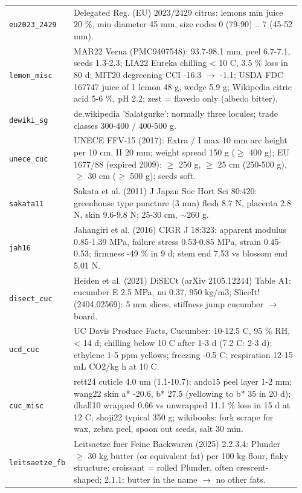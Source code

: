 \documentclass[10.5pt,a4paper]{article}
\begin{document}
{\begin{longtable}{@{}p{0.16\linewidth}p{0.8\linewidth}@{}}
\texttt{eu2023\_\allowbreak{}2429} & Delegated Reg. (EU) 2023/2429 citrus: lemons min juice 20 \%, min diameter 45 mm, size codes 0 (79-90) .. 7 (45-52 mm). \\
\texttt{lemon\_\allowbreak{}misc} & MAR22 Verna (PMC9407548): 93.7-98.1 mm, peel 6.7-7.1, seeds 1.3-2.3; LIA22 Eureka chilling < 10 C, 3.5 \% loss in 80 d; MIT20 degreening CCI -16.3 $\to$ -1.1; USDA FDC 167747 juice of 1 lemon 48 g, wedge 5.9 g; Wikipedia citric acid 5-6 \%, pH 2.2; zest = flavedo only (albedo bitter). \\
\texttt{dewiki\_\allowbreak{}sg} & de.wikipedia 'Salatgurke': normally three locules; trade classes 300-400 / 400-500 g. \\
\texttt{unece\_\allowbreak{}cuc} & UNECE FFV-15 (2017): Extra / I max 10 mm arc height per 10 cm, II 20 mm; weight spread 150 g ($\ge$ 400 g); EU 1677/88 (expired 2009): $\ge$ 250 g, $\ge$ 25 cm (250-500 g), $\ge$ 30 cm ($\ge$ 500 g); seeds soft. \\
\texttt{sakata11} & Sakata et al. (2011) J Japan Soc Hort Sci 80:420: greenhouse type puncture (3 mm) flesh 8.7 N, placenta 2.8 N, skin 9.6-9.8 N; 25-30 cm, $\sim$260 g. \\
\texttt{jah16} & Jahangiri et al. (2016) CIGR J 18:323: apparent modulus 0.85-1.39 MPa, failure stress 0.53-0.85 MPa, strain 0.45-0.53; firmness -49 \% in 9 d; stem end 7.53 vs blossom end 5.01 N. \\
\texttt{disect\_\allowbreak{}cuc} & Heiden et al. (2021) DiSECt (arXiv 2105.12244) Table A1: cucumber E 2.5 MPa, nu 0.37, 950 kg/m3; SliceIt! (2404.02569): 5 mm slices, stiffness jump cucumber $\to$ board. \\
\texttt{ucd\_\allowbreak{}cuc} & UC Davis Produce Facts, Cucumber: 10-12.5 C, 95 \% RH, < 14 d; chilling below 10 C after 1-3 d (7.2 C: 2-3 d); ethylene 1-5 ppm yellows; freezing -0.5 C; respiration 12-15 mL CO2/kg h at 10 C. \\
\texttt{cuc\_\allowbreak{}misc} & rett24 cuticle 4.0 um (1.1-10.7); ando15 peel layer 1-2 mm; wang22 skin a* -20.6, b* 27.5 (yellowing to b* 35 in 20 d); dhall10 wrapped 0.66 vs unwrapped 11.1 \% loss in 15 d at 12 C; shoji22 typical 350 g; wikibooks: fork scrape for wax, zebra peel, spoon out seeds, salt 30 min. \\
\texttt{leitsaetze\_\allowbreak{}fb} & Leitsaetze fuer Feine Backwaren (2025) 2.2.3.4: Plunder $\ge$ 30 kg butter (or equivalent fat) per 100 kg flour, flaky structure; croissant = rolled Plunder, often crescent-shaped; 2.1.1: butter in the name $\to$ no other fats. \\

\end{longtable}}
\end{document}
